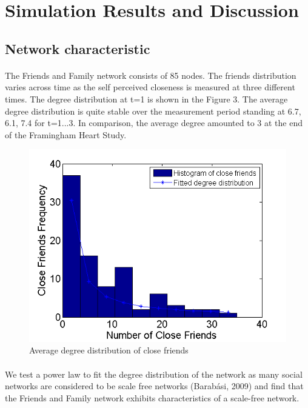 \documentclass[11pt]{article}
\begin{document}
\section{Simulation Results and Discussion}

\subsection{Network characteristic}
\paragraph{}
The Friends and Family network consists of 85 nodes. The friends distribution varies across time as the self perceived closeness is measured at three different times. The degree distribution at t=1 is shown in the Figure 3. The average degree distribution is quite stable over the measurement period standing at 6.7, 6.1, 7.4 for t=1...3. In comparison, the average degree amounted to 3 at the end of the Framingham Heart Study.

\begin{figure}[H]
\center
   \includegraphics[scale = 0.9]{friends_distribution_figure1.png}
   \caption{\label{1} Average degree distribution of close friends}
\end{figure}

\paragraph{}
We test a power law to fit the degree distribution of the network as many social networks are considered to be scale free networks (Barabási, 2009) and find that the Friends and Family network exhibits characteristics of a scale-free network.
\end{document}
